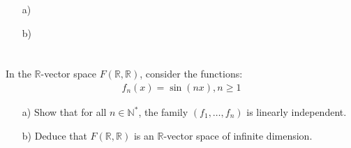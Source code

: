 \documentclass[12pt]{article}
\begin{document}
\begin{correctionbox}                                                                                                                                                                                                                    
	\begin{enumerate}                                                                                                                                      
	    \item[a)] 
	    \item[b)] 
	\end{enumerate}                                                                                                                                        
\end{correctionbox}                                                                                                                                                                                                                      
                                                                                                                                                                                                                                         
\section{}                                                                                                                                                                                                                               
In the $\mathbb{R}$-vector space $F(\mathbb{R}, \mathbb{R})$, consider the functions:
\begin{align*}
f_n(x) = \sin(nx), n \geq 1
\end{align*}

\begin{enumerate}
    \item[a)] Show that for all $n \in \mathbb{N}^*$, the family $(f_1, \ldots, f_n)$ is linearly independent.
    \item[b)] Deduce that $F(\mathbb{R}, \mathbb{R})$ is an $\mathbb{R}$-vector space of infinite dimension.
\end{enumerate}
                                                                                                                                                                                                                                         
\end{document}

